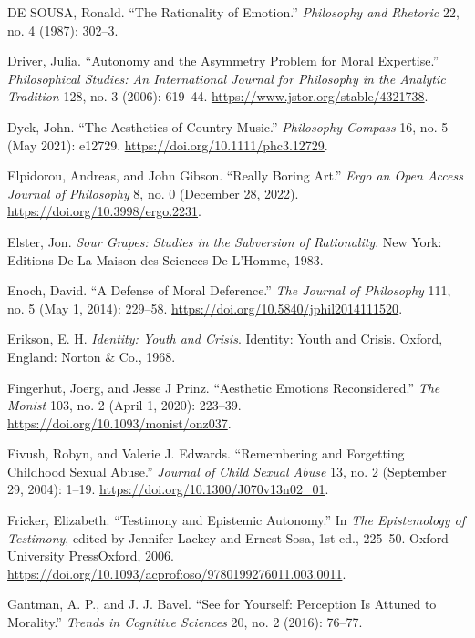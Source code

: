 \documentclass[
  12pt,
]{book}
\newlength{\cslhangindent}
\newenvironment{CSLReferences}[2] %
 {\begin{list}{}{%
  \setlength{\itemindent}{0pt}
  \setlength{\leftmargin}{0pt}
  \setlength{\parsep}{0pt}
  \ifodd #1
   \setlength{\leftmargin}{\cslhangindent}
   \setlength{\itemindent}{-1\cslhangindent}
  \fi
  \setlength{\itemsep}{#2\baselineskip}}}
 {\end{list}}
\theoremstyle{definition}
\theoremstyle{definition}
\theoremstyle{definition}
\theoremstyle{definition}
\theoremstyle{remark}
\begin{document}
\begin{CSLReferences}{1}{0}
DE SOUSA, Ronald. {``The {Rationality} of {Emotion}.''} \emph{Philosophy and Rhetoric} 22, no. 4 (1987): 302--3.

Driver, Julia. {``Autonomy and the {Asymmetry Problem} for {Moral Expertise}.''} \emph{Philosophical Studies: An International Journal for Philosophy in the Analytic Tradition} 128, no. 3 (2006): 619--44. \url{https://www.jstor.org/stable/4321738}.

Dyck, John. {``The Aesthetics of Country Music.''} \emph{Philosophy Compass} 16, no. 5 (May 2021): e12729. \url{https://doi.org/10.1111/phc3.12729}.

Elpidorou, Andreas, and John Gibson. {``Really {Boring Art}.''} \emph{Ergo an Open Access Journal of Philosophy} 8, no. 0 (December 28, 2022). \url{https://doi.org/10.3998/ergo.2231}.

Elster, Jon. \emph{Sour {Grapes}: {Studies} in the {Subversion} of {Rationality}}. New York: Editions De La Maison des Sciences De L'Homme, 1983.

Enoch, David. {``A {Defense} of {Moral Deference}.''} \emph{The Journal of Philosophy} 111, no. 5 (May 1, 2014): 229--58. \url{https://doi.org/10.5840/jphil2014111520}.

Erikson, E. H. \emph{Identity: Youth and Crisis}. Identity: Youth and Crisis. Oxford, England: Norton \& Co., 1968.

Fingerhut, Joerg, and Jesse J Prinz. {``Aesthetic Emotions Reconsidered.''} \emph{The Monist} 103, no. 2 (April 1, 2020): 223--39. \url{https://doi.org/10.1093/monist/onz037}.

Fivush, Robyn, and Valerie J. Edwards. {``Remembering and {Forgetting Childhood Sexual Abuse}.''} \emph{Journal of Child Sexual Abuse} 13, no. 2 (September 29, 2004): 1--19. \url{https://doi.org/10.1300/J070v13n02_01}.

Fricker, Elizabeth. {``Testimony and {Epistemic Autonomy}.''} In \emph{The {Epistemology} of {Testimony}}, edited by Jennifer Lackey and Ernest Sosa, 1st ed., 225--50. Oxford University PressOxford, 2006. \url{https://doi.org/10.1093/acprof:oso/9780199276011.003.0011}.

Gantman, A. P., and J. J. Bavel. {``See for Yourself: Perception Is Attuned to Morality.''} \emph{Trends in Cognitive Sciences} 20, no. 2 (2016): 76--77.


\end{CSLReferences}
\end{document}
